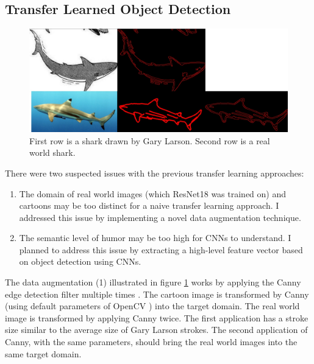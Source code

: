 \documentclass[draft,final,oneside]{vutinfth} %
\begin{document}
\subsection{Transfer Learned Object Detection}

\begin{figure}[ht]
	\centering
  	\includegraphics[width=1.0\textwidth]{graphics/edge_edge_detection.jpg}
	\caption{First row is a shark drawn by Gary Larson. Second row is a real world shark.}
	\label{fig:dataugmentation}
\end{figure}

There were two suspected issues with the previous transfer learning approaches:

\begin{enumerate}
\item The domain of real world images (which ResNet18 was trained on) and cartoons may be too distinct for a naive transfer learning approach. I addressed this issue by implementing a novel data augmentation technique.
\item The semantic level of humor may be too high for CNNs to understand. I planned to address this issue by extracting a high-level feature vector based on object detection using CNNs.
\end{enumerate}

The data augmentation (1) illustrated in figure \ref{fig:dataugmentation} works by applying the Canny edge detection filter multiple times \cite{opencv_library}. The cartoon image is transformed by Canny (using default parameters of OpenCV \cite{opencv_library}) into the target domain. The real world image is transformed by applying Canny twice. The first application has a stroke size similar to the average size of Gary Larson strokes. The second application of Canny, with the same parameters, should bring the real world images into the same target domain.
\end{document}
